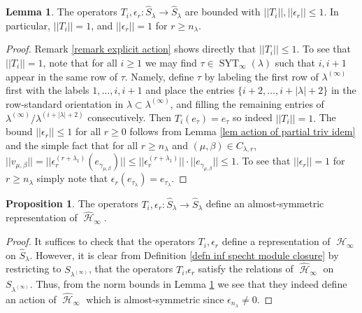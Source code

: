 \documentclass[12pt,reqno]{amsart}
\theoremstyle{definition}
\newtheorem{lem}[thm]{Lemma}
\newtheorem{prop}[thm]{Proposition}
\DeclareMathOperator{\cH}{\mathcal{H}}
\DeclareMathOperator{\SYT}{\mathrm{SYT}}
\begin{document}
\begin{lem}\label{lem operators are bounded}
    The operators $T_i,\epsilon_r: \hat{S}_{\lambda} \rightarrow \hat{S}_{\lambda}$ are bounded with $||T_i||,||\epsilon_r|| \leq 1.$ In particular, $||T_i|| = 1$, and $||\epsilon_r|| = 1$ for $r \geq n_{\lambda}.$
\end{lem}
\begin{proof}
    Remark \ref{remark explicit action} shows directly that $||T_i|| \leq 1.$ To see that $||T_i||=1$, note that for all $i \geq 1$ we may find $\tau \in \SYT_{\infty}(\lambda)$ such that $i,i+1$ appear in the same row of $\tau.$ Namely, define $\tau$ by labeling the first row of $\lambda^{(\infty)}$ first with the labels $1,\dots,i,i+1$ and place the entries $\{i+2,\dots,i+|\lambda|+2\}$ in the row-standard orientation in $\lambda \subset \lambda^{(\infty)}$, and filling the remaining entries of $\lambda^{(\infty)}/\lambda^{(i+|\lambda|+2)}$ consecutively. Then $T_i(e_{\tau}) = e_{\tau}$ so indeed $||T_i|| = 1.$ The bound $||\epsilon_r|| \leq 1$ for all $r \geq 0$ follows from Lemma \ref{lem action of partial triv idem} and the simple fact that for all $r \geq n_{\lambda}$ and $(\mu,\beta) \in C_{\lambda,r}$, $||v_{\mu,\beta}|| = ||\epsilon_{r}^{(r+\lambda_1)}(e_{\gamma_{\mu,\beta}})|| \leq ||\epsilon_{r}^{(r+\lambda_1)}|| \cdot ||e_{\gamma_{\mu,\beta}}|| \leq 1$. To see that $||\epsilon_r|| = 1$ for $r \geq n_{\lambda}$ simply note that $\epsilon_r(e_{\tau_{\lambda}}) = e_{\tau_{\lambda}}.$
\end{proof} 

\begin{prop}\label{prop inf specht are alm-sym}
    The operators $T_i,\epsilon_r: \hat{S}_{\lambda} \rightarrow \hat{S}_{\lambda}$ define an almost-symmetric representation of $\widehat{\cH}_{\infty}.$
\end{prop}
\begin{proof}
    It suffices to check that the operators $T_i,\epsilon_r$ define a representation of $\cH_{\infty}$ on $\hat{S}_{\lambda}.$ However, it is clear from Definition \ref{defn inf specht module closure} by restricting to $S_{\lambda^{(\infty)}}$, that the operators $T_i$,$\epsilon_{r}$ satisfy the relations of $\widehat{\cH}_{\infty}$ on $S_{\lambda^{(\infty)}}$. Thus, from the norm bounds in Lemma \ref{lem operators are bounded} we see that they indeed define an action of $\widehat{\cH}_{\infty}$ which is almost-symmetric since $\epsilon_{n_{\lambda}} \neq 0$.
\end{proof}
\end{document}

